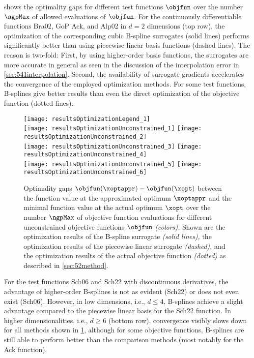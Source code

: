 shows the optimality gaps for different test functions $\objfun$
over the number $\ngpMax$ of allowed evaluations of $\objfun$.
For the continuously differentiable functions
Bra02, GoP\punctfix{,} Ack, and Alp02
in $d = 2$ dimensions (top row),
the optimization of the corresponding cubic B-spline surrogates (solid lines)
performs significantly better than using piecewise linear basis functions
(dashed lines).
The reason is two-fold:
First, by using higher-order basis functions, the surrogates are more accurate
in general as seen in the discussion of the interpolation error in
\cref{sec:541interpolation}.
Second, the availability of surrogate gradients accelerates the
convergence of the employed optimization methods.
For some test functions, B-splines give better results than even
the direct optimization of the objective function (dotted lines).

\begin{figure}
  \texttt{[image: resultsOptimizationLegend\_1]}\\[2mm]%
  \texttt{[image: resultsOptimizationUnconstrained\_1]}%
  \hfill%
  \texttt{[image: resultsOptimizationUnconstrained\_2]}%
  \\[2mm]%
  \texttt{[image: resultsOptimizationUnconstrained\_3]}%
  \hfill%
  \texttt{[image: resultsOptimizationUnconstrained\_4]}%
  \\[2mm]%
  \texttt{[image: resultsOptimizationUnconstrained\_5]}%
  \hfill%
  \texttt{[image: resultsOptimizationUnconstrained\_6]}%
  \caption[Optimality gaps for different objective functions (unconstrained)]{%
    Optimality gaps $\objfun(\xoptappr) - \objfun(\xopt)$ between
    the function value at the approximated optimum $\xoptappr$ and
    the minimal function value at the actual optimum $\xopt$
    over the number $\ngpMax$ of objective function evaluations
    for different unconstrained
    objective functions $\objfun$ \emph{(colors).}
    Shown are the optimization results of the B-spline surrogate
    \emph{(solid lines),}
    the optimization results of the piecewise linear surrogate
    \emph{(dashed),} and
    the optimization results of the actual objective function
    \emph{(dotted)} as described in \cref{sec:52method}.%
  }%
  \label{fig:resultsOptimizationUnconstrainedTestFunctions}%
\end{figure}

For the test functions Sch06 and Sch22 with discontinuous derivatives,
the advantage of higher-order B-splines is not as evident (Sch22) or
does not even exist (Sch06).
However, in low dimensions, i.e., $d \le 4$, B-splines
achieve a slight advantage compared to the piecewise linear basis
for the Sch22 function.
In higher dimensionalities, i.e., $d \ge 6$ (bottom row),
convergence visibly slows down for all methods shown in
\cref{fig:resultsOptimizationUnconstrainedTestFunctions},
although for some objective functions, B-splines are still able
to perform better than the comparison methods
(most notably for the Ack function).

